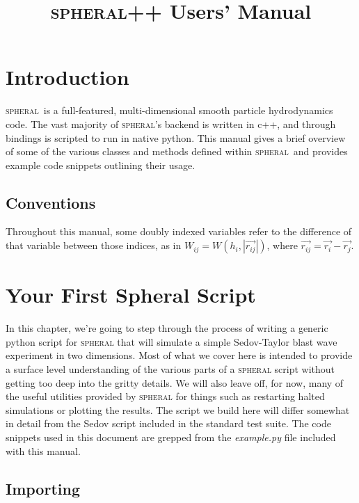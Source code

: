 \documentclass[11pt]{memoir}
\title{\textsc{spheral}++ Users' Manual}
\newcommand{\sph}{\textsc{spheral}}
\begin{document}
\frontmatter
\maketitle
\tableofcontents*


\mainmatter
\chapter{Introduction}

\sph\ is a full-featured, multi-dimensional smooth particle hydrodynamics code. 
The vast majority of \sph's backend is written in c++, and through bindings is scripted to run in native python. 
This manual gives a brief overview of some of the various classes and methods defined within \sph\ and provides example code snippets outlining their usage.

\section{Conventions}

Throughout this manual, some doubly indexed variables refer to the difference of that variable between those indices, as in $W_{ij}=W(h_i,|\vec{r_{ij}}|)$, where $\vec{r_{ij}} = \vec{r_i}-\vec{r_j}$.

\chapter{Your First Spheral Script}

\lstset{basicstyle=\small,style=myCustomPythonStyle}

In this chapter, we're going to step through the process of writing a generic python script for \textsc{spheral} that will simulate a simple Sedov-Taylor blast wave experiment in two dimensions. 
Most of what we cover here is intended to provide a surface level understanding of the various parts of a \textsc{spheral} script without getting too deep into the gritty details. 
We will also leave off, for now, many of the useful utilities provided by \textsc{spheral} for things such as restarting halted simulations or plotting the results. 
The script we build here will differ somewhat in detail from the Sedov script included in the standard test suite. 
The code snippets used in this document are grepped from the \textit{example.py} file included with this manual.

\section{Importing}
\end{document}
